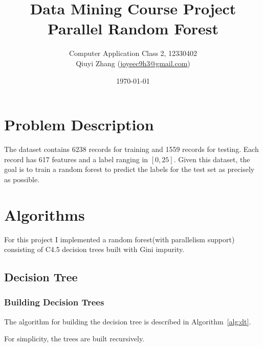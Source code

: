 \documentclass{article}
\begin{document}
\title{
Data Mining Course Project \\
Parallel Random Forest
}
\author {
	Computer Application Class 2, 12330402\\
	Qiuyi Zhang (\href{mailto:joyeec9h3@gmail.com}{joyeec9h3@gmail.com})
}
\date{\today}

\maketitle
\tableofcontents


\section{Problem Description}

The dataset contains 6238 records for training and 1559 records for testing. Each record has 617 features and a label ranging in $[0, 25]$. Given this dataset, the goal is to train a random forest to predict the labels for the test set as precisely as possible.

\section{Algorithms}

For this project I implemented a random forest(with parallelism support) consisting of C4.5 decision trees built with Gini impurity.

\subsection{Decision Tree}

\subsubsection{Building Decision Trees}

The algorithm for building the decision tree is described in Algorithm~\ref{alg:dt}.

For simplicity, the trees are built recursively.
\end{document}
